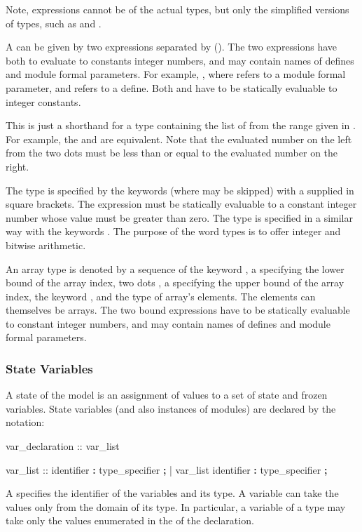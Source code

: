 Note, expressions cannot be of the actual \Enum types, but only the
simplified versions of \Enum types, such as \SymbEnum and \IntSymbEnum.

A  can be given by two expressions
separated by  (). The two
expressions have both to evaluate to constants integer numbers, and
may contain names of defines and module formal parameters. For example,
, where  refers to a module formal
parameter, and  refers to a define. Both  and
 have to be statically evaluable to integer constants.

This is just a shorthand for a \Enum type containing the list
of  from the range given in .
%
For example, the   and
 are equivalent.
%
Note that the evaluated number on the left from the two dots must
be less than or equal to the evaluated number on the right.

The \UWord type is specified by the keywords 
(where  may be skipped) with a 
supplied in square brackets.
%
The expression must be statically evaluable to a constant integer
number whose value must be greater than zero.
%
The \SWord type is specified in a similar way with the keywords
.
%
The purpose of the word types is to offer integer and bitwise
arithmetic.


An array type is denoted by a sequence of the keyword
, a  specifying the lower
bound of the array index, two dots , a
 specifying the upper bound of the array
index, the keyword , and the type of array's
elements. The elements can themselves be arrays. The two bound
expressions have to be statically evaluable to constant integer
numbers, and may contain names of defines and module formal
parameters.


\subsubsection{State Variables}
\label{State Variables}
%
A state of the model is an assignment of values to a set of state
and frozen variables.
%
State variables (and also instances of modules) are declared by the
notation:
%
\begin{Grammar}
var_declaration ::  var_list

var_list :: identifier \textbf{:} type_specifier \textbf{;}
          | var_list identifier \textbf{:} type_specifier \textbf{;}
\end{Grammar}
%
A  specifies the identifier of the
variables and its type.
%
A variable can take the values only from the domain of its type. In
particular, a variable of a \Enum type may take only the values
enumerated in the  of the declaration.

